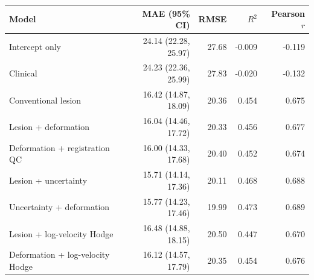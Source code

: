 \begin{tabular}{lrrrr}
\toprule
Model & MAE (95\% CI) & RMSE & $R^2$ & Pearson $r$ \\
\midrule
Intercept only & 24.14 (22.28, 25.97) & 27.68 & -0.009 & -0.119 \\
Clinical & 24.23 (22.36, 25.99) & 27.83 & -0.020 & -0.132 \\
Conventional lesion & 16.42 (14.87, 18.09) & 20.36 & 0.454 & 0.675 \\
Lesion + deformation & 16.04 (14.46, 17.72) & 20.33 & 0.456 & 0.677 \\
Deformation + registration QC & 16.00 (14.33, 17.68) & 20.40 & 0.452 & 0.674 \\
Lesion + uncertainty & 15.71 (14.14, 17.36) & 20.11 & 0.468 & 0.688 \\
Uncertainty + deformation & 15.77 (14.23, 17.46) & 19.99 & 0.473 & 0.689 \\
Lesion + log-velocity Hodge & 16.48 (14.88, 18.15) & 20.50 & 0.447 & 0.670 \\
Deformation + log-velocity Hodge & 16.12 (14.57, 17.79) & 20.35 & 0.454 & 0.676 \\
\bottomrule
\end{tabular}
